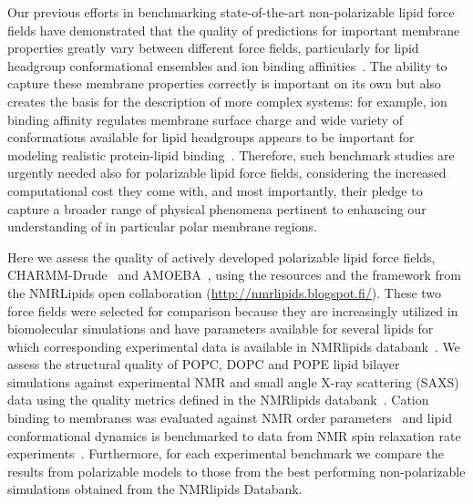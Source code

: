\documentclass[journal=jacsat,manuscript=article,layout=singlecolumn]{achemso}
\begin{document}
Our previous efforts in benchmarking state-of-the-art non-polarizable lipid force fields have demonstrated that the quality of predictions for important membrane properties greatly vary between different force fields, particularly for lipid headgroup conformational ensembles and ion binding affinities~\cite{Botan2015,Catte2016,Antila2019,bacle21,Antila2021,Antila2022,Databank}. The ability to capture these membrane properties correctly is important on its own but also creates the basis for the description of more complex systems: for example, ion binding affinity regulates membrane surface charge and wide variety of conformations available for lipid headgroups appears to be important for modeling realistic protein-lipid binding~\cite{bacle21}. Therefore, such benchmark studies are urgently needed also for polarizable lipid force fields, considering  the increased computational cost they come with, and most importantly, their pledge
to capture a broader range of physical phenomena pertinent to enhancing our understanding of in particular polar membrane regions.


Here we assess the quality of actively developed polarizable lipid force fields, CHARMM-Drude~\cite{li2017drude,yu2023drude} and  AMOEBA~\cite{chu2018anionicpolarizable,chu2018polarizable}, using the resources and the framework from the NMRLipids open collaboration (\url{http://nmrlipids.blogspot.fi/}). These two force fields were selected for comparison because they are increasingly utilized in biomolecular simulations and have parameters available for several lipids for which corresponding experimental data is available in NMRlipids databank~\cite{Databank}. We assess the structural quality of POPC, DOPC and POPE lipid bilayer simulations against experimental NMR and small angle X-ray scattering (SAXS) data using the quality metrics defined in the NMRlipids databank~\cite{Databank}. Cation binding to membranes was evaluated against NMR order parameters~\cite{Catte2016} and lipid conformational dynamics is benchmarked to data from NMR spin relaxation rate experiments~\cite{ferreira15,Antila2021}. 
Furthermore, for each experimental benchmark we compare the results from polarizable models to those from the best performing non-polarizable simulations obtained from the NMRlipids Databank\cite{Databank}. 

\end{document}
